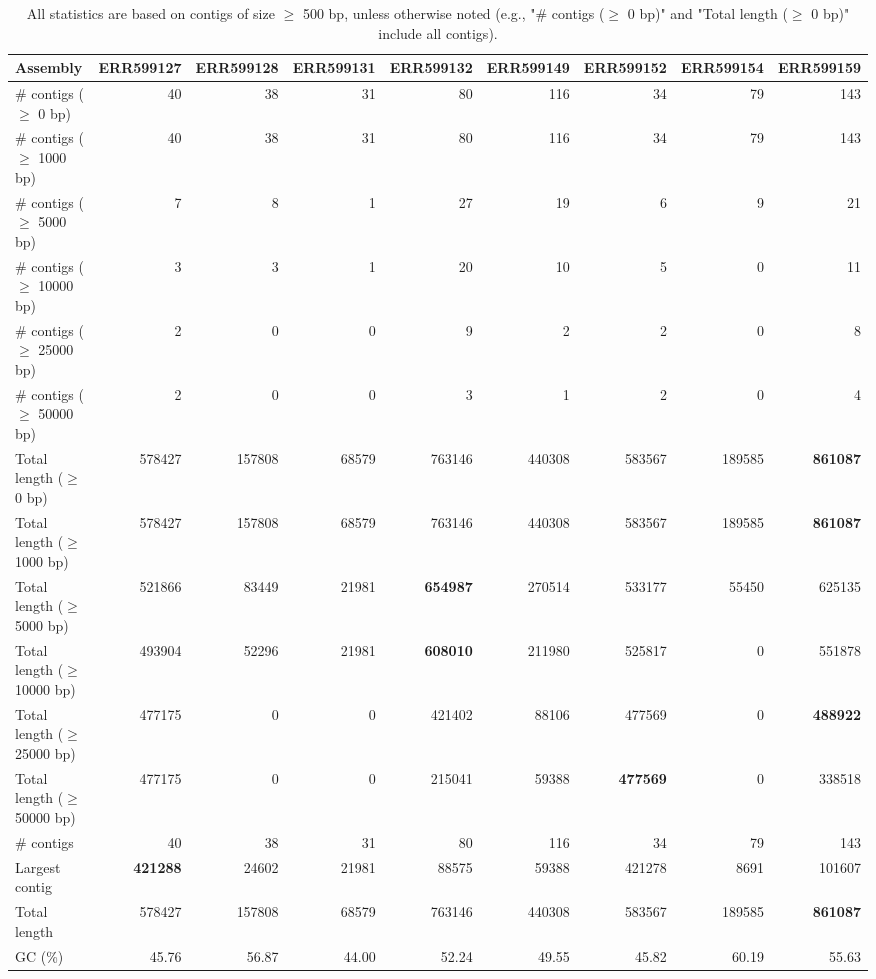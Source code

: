 \documentclass[12pt,a4paper]{article}
\begin{document}
\begin{table}[ht]
\begin{center}
\caption{All statistics are based on contigs of size $\geq$ 500 bp, unless otherwise noted (e.g., "\# contigs ($\geq$ 0 bp)" and "Total length ($\geq$ 0 bp)" include all contigs).}
\begin{tabular}{|l*{8}{|r}|}
\hline
Assembly & ERR599127 & ERR599128 & ERR599131 & ERR599132 & ERR599149 & ERR599152 & ERR599154 & ERR599159 \\ \hline
\# contigs ($\geq$ 0 bp) & 40 & 38 & 31 & 80 & 116 & 34 & 79 & 143 \\ \hline
\# contigs ($\geq$ 1000 bp) & 40 & 38 & 31 & 80 & 116 & 34 & 79 & 143 \\ \hline
\# contigs ($\geq$ 5000 bp) & 7 & 8 & 1 & 27 & 19 & 6 & 9 & 21 \\ \hline
\# contigs ($\geq$ 10000 bp) & 3 & 3 & 1 & 20 & 10 & 5 & 0 & 11 \\ \hline
\# contigs ($\geq$ 25000 bp) & 2 & 0 & 0 & 9 & 2 & 2 & 0 & 8 \\ \hline
\# contigs ($\geq$ 50000 bp) & 2 & 0 & 0 & 3 & 1 & 2 & 0 & 4 \\ \hline
Total length ($\geq$ 0 bp) & 578427 & 157808 & 68579 & 763146 & 440308 & 583567 & 189585 & {\bf 861087} \\ \hline
Total length ($\geq$ 1000 bp) & 578427 & 157808 & 68579 & 763146 & 440308 & 583567 & 189585 & {\bf 861087} \\ \hline
Total length ($\geq$ 5000 bp) & 521866 & 83449 & 21981 & {\bf 654987} & 270514 & 533177 & 55450 & 625135 \\ \hline
Total length ($\geq$ 10000 bp) & 493904 & 52296 & 21981 & {\bf 608010} & 211980 & 525817 & 0 & 551878 \\ \hline
Total length ($\geq$ 25000 bp) & 477175 & 0 & 0 & 421402 & 88106 & 477569 & 0 & {\bf 488922} \\ \hline
Total length ($\geq$ 50000 bp) & 477175 & 0 & 0 & 215041 & 59388 & {\bf 477569} & 0 & 338518 \\ \hline
\# contigs & 40 & 38 & 31 & 80 & 116 & 34 & 79 & 143 \\ \hline
Largest contig & {\bf 421288} & 24602 & 21981 & 88575 & 59388 & 421278 & 8691 & 101607 \\ \hline
Total length & 578427 & 157808 & 68579 & 763146 & 440308 & 583567 & 189585 & {\bf 861087} \\ \hline
GC (\%) & 45.76 & 56.87 & 44.00 & 52.24 & 49.55 & 45.82 & 60.19 & 55.63 \\ \hline

\end{tabular}
\end{center}
\end{table}
\end{document}
